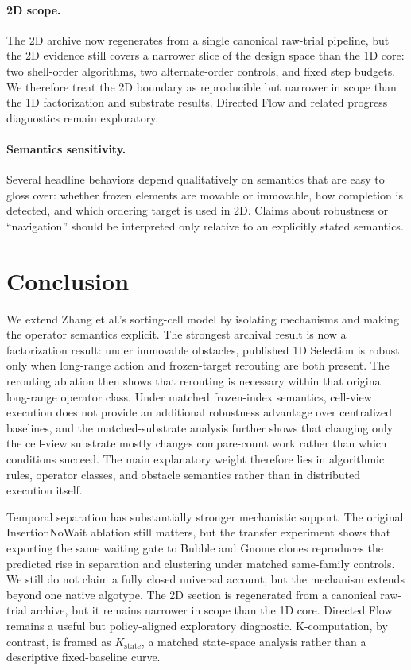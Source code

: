 \documentclass[11pt]{article}
\begin{document}
\paragraph{2D scope.}
The 2D archive now regenerates from a single canonical raw-trial pipeline, but the 2D evidence
still covers a narrower slice of the design space than the 1D core: two shell-order algorithms,
two alternate-order controls, and fixed step budgets. We therefore treat the 2D boundary as
reproducible but narrower in scope than the 1D factorization and substrate results. Directed Flow
and related progress diagnostics remain exploratory.

\paragraph{Semantics sensitivity.}
Several headline behaviors depend qualitatively on semantics that are easy to gloss over: whether
frozen elements are movable or immovable, how completion is detected, and which ordering target is
used in 2D. Claims about robustness or ``navigation'' should be interpreted only relative to an
explicitly stated semantics.

\section{Conclusion}
We extend Zhang et al.'s sorting-cell model by isolating mechanisms and making the operator
semantics explicit. The strongest archival result is now a factorization result: under immovable
obstacles, published 1D Selection is robust only when long-range action and frozen-target rerouting
are both present. The rerouting ablation then shows that rerouting is necessary within that
original long-range operator class. Under matched frozen-index semantics, cell-view execution does
not provide an additional robustness advantage over centralized baselines, and the matched-substrate
analysis further shows that changing only the cell-view substrate mostly changes compare-count work
rather than which conditions succeed.
The main explanatory
weight therefore lies in algorithmic rules, operator classes, and obstacle semantics rather than in
distributed execution itself.

Temporal separation has substantially stronger mechanistic support. The original
InsertionNoWait ablation still matters, but the transfer experiment shows that exporting the same waiting gate to
Bubble and Gnome clones reproduces the predicted rise in separation and clustering under matched
same-family controls. We still do not claim a fully closed universal account, but the mechanism
extends beyond one native algotype. The 2D section is regenerated from a canonical raw-trial
archive, but it remains narrower in scope than the 1D core. Directed Flow remains a useful but
policy-aligned exploratory diagnostic. K-computation, by contrast, is framed as
$K_{\mathrm{state}}$, a matched state-space analysis rather than a descriptive fixed-baseline curve.
\end{document}
